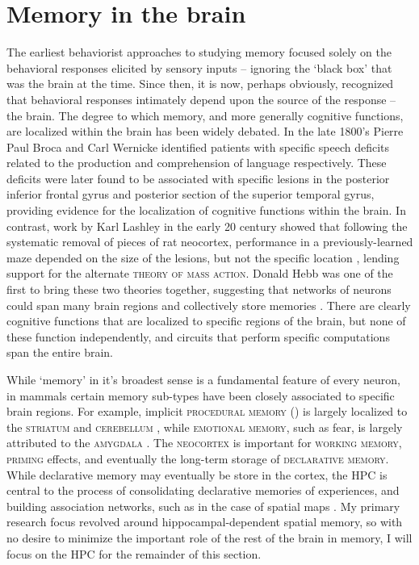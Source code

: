 \section{Memory in the brain}\label{sec:intro:memory:structure}
The earliest behaviorist approaches to studying memory focused solely on the behavioral responses elicited by sensory inputs -- ignoring the `black box' that was the brain at the time. 
Since then, it is now, perhaps obviously, recognized that behavioral responses intimately depend upon the source of the response -- the brain.
The degree to which memory, and more generally cognitive functions, are localized within the brain has been widely debated.
In the late 1800's Pierre Paul Broca and Carl Wernicke identified patients with specific speech deficits related to the production and comprehension of language respectively.
These deficits were later found to be associated with specific lesions in the posterior inferior frontal gyrus and posterior section of the superior temporal gyrus, providing evidence for the localization of cognitive functions within the brain.
In contrast, work by Karl Lashley in the early 20 century showed that following the systematic removal of pieces of rat neocortex, performance in a previously-learned maze depended on the size of the lesions, but not the specific location \citep{Lashley1929}, lending support for the alternate \textsc{theory of mass action}.
Donald Hebb was one of the first to bring these two theories together, suggesting that networks of neurons could span many brain regions and collectively store memories \citep{Hebb1949}.
There are clearly cognitive functions that are localized to specific regions of the brain, but none of these function independently, and circuits that perform specific computations span the entire brain.

While `memory' in it's broadest sense is a fundamental feature of every neuron, in mammals certain memory sub-types have been closely associated to specific brain regions.
For example, implicit \textsc{procedural memory} () is largely localized to the \textsc{striatum} and \textsc{cerebellum} , while \textsc{emotional memory}, such as fear, is largely attributed to the \textsc{amygdala} \citep{LeDoux2000}.
The \textsc{neocortex} is important for \textsc{working memory}, \textsc{priming} effects, and eventually the long-term storage of \textsc{declarative memory}.
While declarative memory may eventually be store in the cortex, the \ac{HPC} is central to the process of consolidating declarative memories of experiences, and building association networks, such as in the case of spatial maps \citep{Eichenbaum2000}.
My primary research focus revolved around hippocampal-dependent spatial memory, so with no desire to minimize the important role of the rest of the brain in memory, I will focus on the \ac{HPC} for the remainder of this section. 

